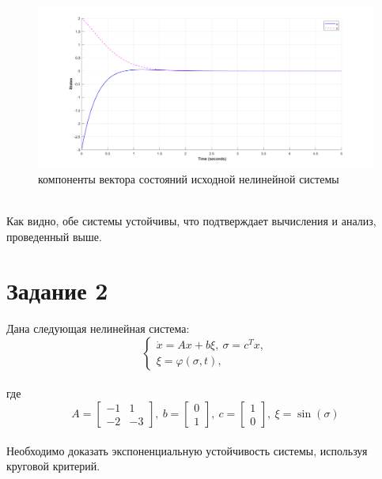 \documentclass[12pt]{article}
\begin{document}
\begin{figure}[h!]
    \centering
    \includegraphics[width=\textwidth]{non_lin_states}
    \caption{компоненты вектора состояний исходной нелинейной системы}
    \label{fig:non_lin_states}
\end{figure} \\
Как видно, обе системы устойчивы, что подтверждает вычисления и анализ, проведенный выше.

\section*{Задание 2}
Дана следующая нелинейная система:
\[
\begin{cases}
    \dot{x} = Ax + b\xi, \ \sigma=c^Tx,\\
    \xi = \varphi(\sigma, t),
\end{cases}
\]\\ где
\[
A = \begin{bmatrix}
-1 & 1\\
-2 & -3
\end{bmatrix}, \ b = \begin{bmatrix}
0\\
1
\end{bmatrix}, \ c = \begin{bmatrix}
1\\
0
\end{bmatrix}, \ \xi = \sin{(\sigma)}
\]\\
Необходимо доказать экспоненциальную устойчивость системы, используя круговой критерий.
\end{document}
